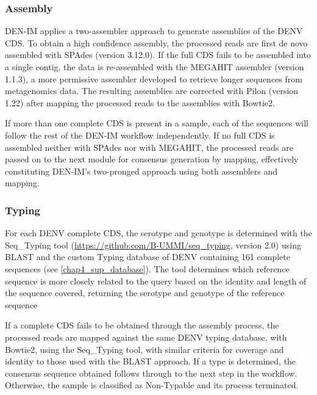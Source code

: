 \subsubsection{Assembly}

DEN-IM applies a two-assembler approach to generate assemblies of the DENV CDS. To obtain a high confidence assembly, the processed reads are first de novo assembled with SPAdes \citep{bankevich_spades_2012} (version 3.12.0). If the full CDS fails to be assembled into a single contig, the data is re-assembled with the MEGAHIT assembler \citep{li_megahit_2015} (version 1.1.3), a more permissive assembler developed to retrieve longer sequences from metagenomics data. The resulting assemblies are corrected with Pilon \citep{walker_pilon_2014} (version 1.22) after mapping the processed reads to the assemblies with Bowtie2.

If more than one complete CDS is present in a sample, each of the sequences will follow the rest of the DEN-IM workflow independently. If no full CDS is assembled neither with SPAdes nor with MEGAHIT, the processed reads are passed on to the next module for consensus generation by mapping, effectively constituting DEN-IM’s two-pronged approach using both assemblers and mapping.

\subsubsection{Typing}

For each DENV complete CDS, the serotype and genotype is determined with the Seq\_Typing tool (\url{https://github.com/B-UMMI/seq\_typing}, version 2.0) \citep{machado_epidemiological_2017} using BLAST \citep{altschul_gapped_1997} and the custom Typing database of DENV containing 161 complete sequences (see \ref{chap4_sup_database}). The tool determines which reference sequence is more closely related to the query based on the identity and length of the sequence covered, returning the serotype and genotype of the reference sequence

If a complete CDS fails to be obtained through the assembly process, the processed reads are mapped against the same DENV typing database, with Bowtie2, using the Seq\_Typing tool, with similar criteria for coverage and identity to those used with the BLAST approach. If a type is determined, the consensus sequence obtained follows through to the next step in the workflow. Otherwise, the sample is classified as Non-Typable and its process terminated.

